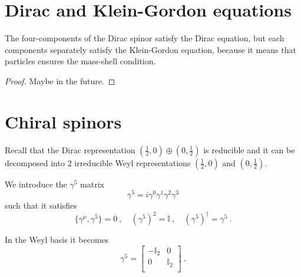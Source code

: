 \section{Dirac and Klein-Gordon equations}

    The four-components of the Dirac spinor satisfy the Dirac equation, but each components separately satisfy the Klein-Gordon equation, because it means that particles ensures the mass-shell condition.
    \begin{proof}
        Maybe in the future.
    \end{proof}

\section{Chiral spinors}

    Recall that the Dirac representation $(\frac{1}{2}, 0) \oplus (0, \frac{1}{2})$ is reducible and it can be decomposed into $2$ irreducible Weyl representations $(\frac{1}{2}, 0)$ and $(0, \frac{1}{2})$. 

    We introduce the $\gamma^5$ matrix 
    \begin{equation*}
        \gamma^5 = i \gamma^0 \gamma^1 \gamma^2 \gamma^3
    \end{equation*}
    such that it satisfies 
    \begin{equation*}
        \{\gamma^\mu, \gamma^5\} = 0~, \quad (\gamma^5)^2 = \mathbb I~, \quad (\gamma^5)^\dagger = \gamma^5 ~.
    \end{equation*}
    
    In the Weyl basis it becomes 
    \begin{equation*}
        \gamma^5 = \begin{bmatrix}
            - \mathbb I_2 & 0 \\ 0 & \mathbb I_2 \\
        \end{bmatrix} ~.
    \end{equation*}

